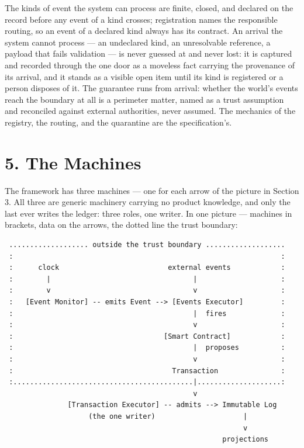 \documentclass[11pt,a4paper]{article}
\newcommand{\clabel}[1]{\leavevmode\hypertarget{clause-#1}{}%
  \marginpar{\raggedright\scriptsize\ttfamily\textcolor{gray}{#1}}}
\begin{document}
\clabel{C-4.12}The kinds of event the system can process are finite,
closed, and declared on the record before any event of a kind crosses;
registration names the responsible routing, so an event of a declared
kind always has its contract. An arrival the system cannot process ---
an undeclared kind, an unresolvable reference, a payload that fails
validation --- is never guessed at and never lost: it is captured and
recorded through the one door as a moveless fact carrying the
provenance of its arrival, and it stands as a visible open item until
its kind is registered or a person disposes of it. The guarantee runs
from arrival: whether the world's events reach the boundary at all is a
perimeter matter, named as a trust assumption and reconciled against
external authorities, never assumed. The mechanics of the registry, the
routing, and the quarantine are the specification's.

\hypertarget{the-machines}{%
\section{5. The Machines}\label{the-machines}}

\clabel{C-5.1}The framework has three machines --- one for each arrow of the picture
in Section 3. All three are generic machinery carrying no product
knowledge, and only the last ever writes the ledger: three roles, one
writer. In one picture --- machines in brackets, data on the arrows, the
dotted line the trust boundary:

\begin{verbatim}
 ................... outside the trust boundary ...................
 :                                                                :
 :      clock                          external events            :
 :        |                                  |                    :
 :        v                                  v                    :
 :   [Event Monitor] -- emits Event --> [Events Executor]         :
 :                                           |  fires             :
 :                                           v                    :
 :                                    [Smart Contract]            :
 :                                           |  proposes          :
 :                                           v                    :
 :                                      Transaction               :
 :...........................................|....................:
                                             v
               [Transaction Executor] -- admits --> Immutable Log
                    (the one writer)                     |
                                                         v
                                                    projections
\end{verbatim}
\end{document}
